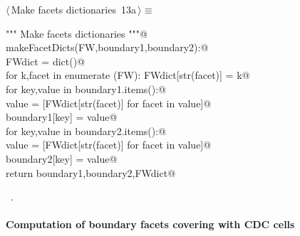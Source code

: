 \documentclass[11pt,oneside]{article}	%
\begin{document}
\begin{flushleft} \small \label{scrap13}
\protect{}$\langle\,$Make facets dictionaries\nobreak\ {\footnotesize 13a}$\,\rangle\equiv$
\vspace{-1ex}
\begin{list}{}{} \item
\mbox{}\verb@""" Make facets dictionaries """@\\
\mbox{}\verb@def makeFacetDicts(FW,boundary1,boundary2):@\\
\mbox{}\verb@   FWdict = dict()@\\
\mbox{}\verb@   for k,facet in enumerate (FW): FWdict[str(facet)] = k@\\
\mbox{}\verb@   for key,value in boundary1.items():@\\
\mbox{}\verb@      value = [FWdict[str(facet)] for facet in value]@\\
\mbox{}\verb@      boundary1[key] = value@\\
\mbox{}\verb@   for key,value in boundary2.items():@\\
\mbox{}\verb@      value = [FWdict[str(facet)] for facet in value]@\\
\mbox{}\verb@      boundary2[key] = value@\\
\mbox{}\verb@   return boundary1,boundary2,FWdict@\\
\mbox{}\verb@@{\NWsep}
\end{list}
\vspace{-1ex}
\footnotesize\addtolength{\baselineskip}{-1ex}
\begin{list}{}{\setlength{\itemsep}{-\parsep}\setlength{\itemindent}{-\leftmargin}}
\item \NWtxtMacroRefIn\ .
\end{list}
\end{flushleft}


\paragraph{Computation of boundary facets covering with CDC cells}
\end{document}
